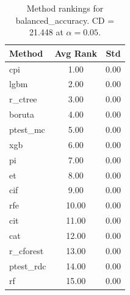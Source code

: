 \begin{table}[h]
\centering
\caption{Method rankings for balanced_accuracy. CD = 21.448 at $\alpha=0.05$.}
\label{tab:ranks_balanced_accuracy}
\begin{tabular}{lcc}
\toprule
Method & Avg Rank & Std \\
\midrule
cpi & 1.00 & 0.00 \\
lgbm & 2.00 & 0.00 \\
r_ctree & 3.00 & 0.00 \\
boruta & 4.00 & 0.00 \\
ptest_mc & 5.00 & 0.00 \\
xgb & 6.00 & 0.00 \\
pi & 7.00 & 0.00 \\
et & 8.00 & 0.00 \\
cif & 9.00 & 0.00 \\
rfe & 10.00 & 0.00 \\
cit & 11.00 & 0.00 \\
cat & 12.00 & 0.00 \\
r_cforest & 13.00 & 0.00 \\
ptest_rdc & 14.00 & 0.00 \\
rf & 15.00 & 0.00 \\
\bottomrule
\end{tabular}
\end{table}